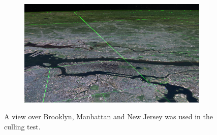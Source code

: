 \begin{figure}[htbp]
    \centering
    \begin{subfigure}[bt]{0.9\textwidth}
        \includegraphics[width=\textwidth]{figures/results/culling/cam_a.png}
    \end{subfigure}
    \caption{A view over Brooklyn, Manhattan and New Jersey was used in the culling test.}
    \label{fig:culling}
\end{figure}

